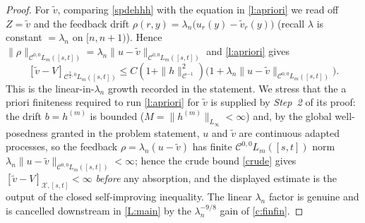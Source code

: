 \documentclass[12pt]{article}
\theoremstyle{definition}
\DeclareMathOperator{\1}{\mathbbm{1}}%
\renewcommand{\le}{\leqslant}
\newcommand{\wt}{\widetilde}
\newcommand{\C}{\mathcal{C}}
\newcommand{\X}{\mathcal{X}}
\begin{document}
\begin{proof}
For $\wt v$, comparing \eqref{spdehhh} with the equation in \cref{l:apriori} we
read off $Z=\wt v$ and the feedback drift
$\rho(r,y)=\lambda_n\bigl(u_r(y)-\wt v_r(y)\bigr)$ (recall $\lambda$ is constant
$=\lambda_n$ on $[n,n+1)$). Hence
$\|\rho\|_{\C^{0,0}L_m([s,t])}=\lambda_n\|u-\wt v\|_{\C^{0,0}L_m([s,t])}$ and
\cref{l:apriori} gives
\[
[\wt v-V]_{\C^{\frac34,0}L_m([s,t])}
\le C(1+\|h\|_{\C^{-1}}^2)\bigl(1+\lambda_n\|u-\wt v\|_{\C^{0,0}L_m([s,t])}\bigr).
\]
This is the linear-in-$\lambda_n$ growth recorded in the statement. We stress that the
a priori finiteness required to run \cref{l:apriori} for $\wt v$ is supplied by
\emph{Step~2} of its proof: the drift $b=h^{(m)}$ is bounded ($M=\|h^{(m)}\|_{L_\infty}<\infty$)
and, by the global well-posedness granted in the problem statement, $u$ and $\wt v$ are
continuous adapted processes, so the feedback $\rho=\lambda_n(u-\wt v)$ has finite
$\C^{0,0}L_m([s,t])$ norm $\lambda_n\|u-\wt v\|_{\C^{0,0}L_m([s,t])}<\infty$; hence the
crude bound \eqref{crude} gives $[\wt v-V]_{\X,[s,t]}<\infty$ \emph{before} any absorption,
and the displayed estimate is the output of the closed self-improving inequality. The linear
$\lambda_n$ factor is genuine and is cancelled downstream in \cref{L:main} by the
$\lambda_n^{-9/8}$ gain of \cref{c:finfin}.
\end{proof}
\end{document}
